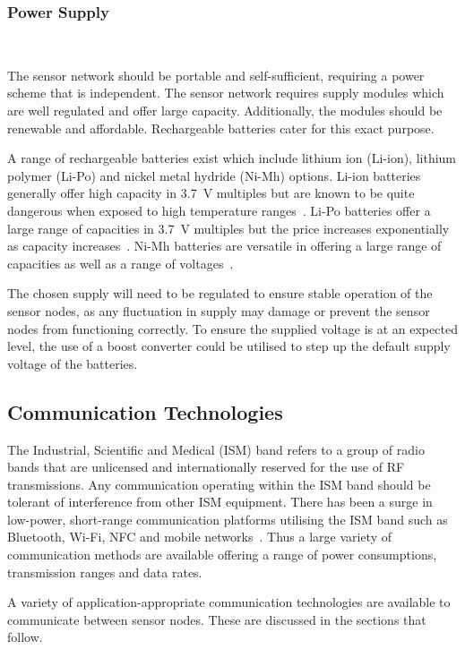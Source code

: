 \documentclass[10pt,twocolumn]{witseiepaper}
\begin{document}
		\subsubsection{Power Supply} $   $
			
			The sensor network should be portable and self-sufficient, requiring a power scheme that is independent. The sensor network requires supply modules which are well regulated and offer large capacity. Additionally, the modules should be renewable and affordable. Rechargeable batteries cater for this exact purpose.

			A range of rechargeable batteries exist which include lithium ion (Li-ion), lithium polymer (Li-Po) and nickel metal hydride (Ni-Mh) options. Li-ion batteries generally offer high capacity in 3.7~V multiples but are known to be quite dangerous when exposed to high temperature ranges~\cite{li-ion}. Li-Po batteries offer a large range of capacities in 3.7~V multiples but the price increases exponentially as capacity increases~\cite{li-po}. Ni-Mh batteries are versatile in offering a large range of capacities as well as a range of voltages~\cite{ni-mh}.

			The chosen supply will need to be regulated to ensure stable operation of the sensor nodes, as any fluctuation in supply may damage or prevent the sensor nodes from functioning correctly. To ensure the supplied voltage is at an expected level, the use of a boost converter could be utilised to step up the default supply voltage of the batteries.
	
	\subsection{Communication Technologies}
	
		The Industrial, Scientific and Medical (ISM) band refers to a group of radio bands that are unlicensed and internationally reserved for the use of RF transmissions. Any communication operating within the ISM band should be tolerant of interference from other ISM equipment. There has been a surge in low-power, short-range communication platforms utilising the ISM band such as Bluetooth, \mbox{Wi-Fi}, NFC and mobile networks~\cite{ism}. Thus a large variety of communication methods are available offering a range of power consumptions, transmission ranges and data rates.
	
		A variety of application-appropriate communication technologies are available to communicate between sensor nodes. These are discussed in the sections that follow.
		
\end{document}

